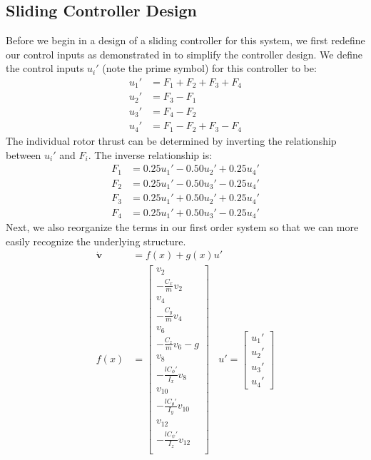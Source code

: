 \documentclass[conference]{IEEEtran}
\begin{document}
\subsection{Sliding Controller Design}
Before we begin in a design of a sliding controller for this system, we first redefine our control inputs as demonstrated in \cite{bib:inputs} to simplify the controller design. We define the control inputs $u_i'$ (note the prime symbol) for this controller to be:
\begin{align*}
u_1' &= F_1+F_2+F_3+F_4 \\
u_2' &= F_3-F_1 \\
u_3' &= F_4-F_2 \\
u_4' &= F_1-F_2+F_3-F_4
\end{align*}
The individual rotor thrust can be determined by inverting the relationship between $u_i'$ and $F_i$. The inverse relationship is:
\begin{align*}
F_1 &= 0.25u_1' - 0.50u_2' + 0.25u_4' \\
F_2 &= 0.25u_1' - 0.50u_3' - 0.25u_4' \\
F_3 &= 0.25u_1' + 0.50u_2' + 0.25u_4' \\
F_4 &= 0.25u_1' + 0.50u_3' - 0.25u_4'
\end{align*}
Next, we also reorganize the terms in our first order system so that we can more easily recognize the underlying structure.
\begin{align*}
\dot{\mathbf{v}} &= f(x) + g(x)u' \\
f(x) &= \begin{bmatrix}
v_2 \\
-\frac{C_x}{m}v_2 \\
v_4 \\
-\frac{C_y}{m}v_4 \\
v_6 \\
-\frac{C_z}{m}v_6 - g \\
v_8 \\
-\frac{lC_\phi'}{I_x}v_8 \\
v_{10} \\
-\frac{lC_\theta'}{I_y}v_{10} \\
v_{12} \\
-\frac{lC_\psi'}{I_z}v_{12} \\
\end{bmatrix} \ \ \ \ u' = \begin{bmatrix}
u_1' \\ u_2' \\ u_3' \\ u_4' \end{bmatrix}
\end{align*}
\end{document}
